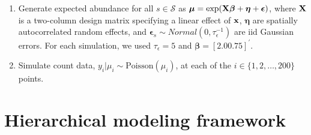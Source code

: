 \documentclass[12pt,fleqn]{article}
\def\bfx{{\bf x}}
\def\bfeta{\boldsymbol{\eta}}
\def\bfbeta{\boldsymbol{\beta}}
\def\bfmu{\boldsymbol{\mu}}
\def\bfepsilon{\boldsymbol{\epsilon}}
\begin{document}
\begin{flushleft}
\begin{enumerate}
  \item  Generate expected abundance for all $s \in \mathcal{S}$ as $\bfmu = \exp( {\bf X}\bfbeta + \bfeta +\bfepsilon )$, where ${\bf X}$ is a two-column design matrix specifying a linear effect of $\bfx$, $\bfeta$ are spatially autocorrelated random effects, and $\bfepsilon_s \sim Normal(0,\tau_\epsilon^{-1})$ are iid Gaussian errors.  For each simulation, we used $\tau_\epsilon = 5$ and $\bfbeta = [2.0 0.75]^\prime$.
  \item Simulate count data, $y_i|\mu_i \sim \textrm{Poisson}(\mu_i)$, at each of the $i \in \{ 1,2,\hdots,200 \}$ points.
\end{enumerate}


\section{Hierarchical modeling framework}


\end{flushleft}
\end{document}
